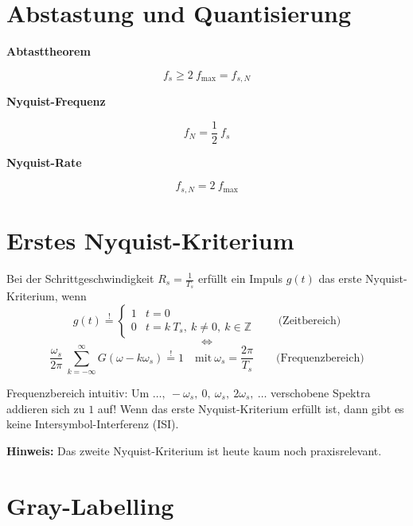 \documentclass[a4paper, 11pt]{article}
\newcommand{\fancyformula}[2]{
        \small
        \raggedright{\sffamily\textbf{#1}}
        #2
}
\begin{document}
\section*{Abstastung und Quantisierung}
\fancyformula{Abtasttheorem}{
	\[
		f_s \geq 2 ~ f_{\mathrm{max}} = f_{s, N}
	\]
}

\fancyformula{Nyquist-Frequenz}{
	\[
		f_N = \frac{1}{2} ~ f_s
	\]
}

\fancyformula{Nyquist-Rate}{
	\[
		f_{s, N} = 2 ~ f_{\mathrm{max}}
	\]
}


\section*{Erstes Nyquist-Kriterium}
Bei der Schrittgeschwindigkeit $R_s = \frac{1}{T_s}$ erfüllt ein Impuls $g(t)$ das erste Nyquist-Kriterium, wenn
\[
	g(t) \overset{!}{=} \begin{cases}
		1 & t = 0\\
		0 & t = k ~ T_s, ~ k \neq 0, ~ k \in \mathbb Z
	\end{cases} \qquad \text{(Zeitbereich)}
\]
\[
	\Leftrightarrow
\]
\[
	\frac{\omega_s}{2 \pi} ~ \sum_{k = -\infty}^\infty G(\omega - k \omega_s) \overset{!}{=} 1 \quad \text{mit} ~ \omega_s = \frac{2 \pi}{T_s} \qquad \text{(Frequenzbereich)}
\]

Frequenzbereich intuitiv: Um $\ldots, ~ -\omega_s, ~ 0, ~ \omega_s, ~ 2 \omega_s, ~ \ldots$ verschobene Spektra addieren sich zu $1$ auf!
Wenn das erste Nyquist-Kriterium erfüllt ist, dann gibt es keine Intersymbol-Interferenz (ISI).

\textbf{Hinweis:} Das zweite Nyquist-Kriterium ist heute kaum noch praxisrelevant.

\section*{Gray-Labelling}
\end{document}
